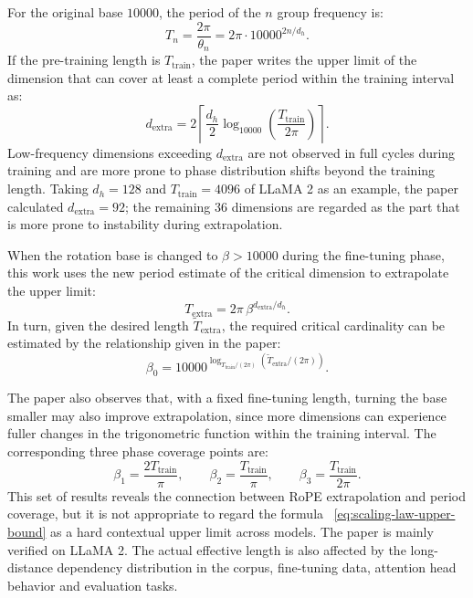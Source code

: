 \documentclass[UTF8,fontset=none,a4paper,10pt]{ctexart}
\begin{document}
For the original base $10000$, the period of the $n$ group frequency is:
\begin{equation}
  T_n=\frac{2\pi}{\theta_n}=2\pi\cdot10000^{2n/d_h}.
  \label{eq:scaling-period}
\end{equation}
If the pre-training length is $T_{\mathrm{train}}$, the paper writes the upper limit of the dimension that can cover at least a complete period within the training interval as:
\begin{equation}
  d_{\mathrm{extra}}
  =2\left\lceil
  \frac{d_h}{2}\log_{10000}\!\left(\frac{T_{\mathrm{train}}}{2\pi}\right)
  \right\rceil.
  \label{eq:critical-dimension-scaling-law}
\end{equation}
Low-frequency dimensions exceeding $d_{\mathrm{extra}}$ are not observed in full cycles during training and are more prone to phase distribution shifts beyond the training length. Taking $d_h=128$ and $T_{\mathrm{train}}=4096$ of LLaMA 2 as an example, the paper calculated $d_{\mathrm{extra}}=92$; the remaining 36 dimensions are regarded as the part \cite{liu2024scalingrope} that is more prone to instability during extrapolation.

When the rotation base is changed to $\beta>10000$ during the fine-tuning phase, this work uses the new period estimate of the critical dimension to extrapolate the upper limit:
\begin{equation}
  T_{\mathrm{extra}}
  =2\pi\,\beta^{d_{\mathrm{extra}}/d_h}.
  \label{eq:scaling-law-upper-bound}
\end{equation}
In turn, given the desired length $\widetilde T_{\mathrm{extra}}$, the required critical cardinality can be estimated by the relationship given in the paper:
\begin{equation}
  \beta_0
  =10000^{\log_{T_{\mathrm{train}}/(2\pi)}
  \left(\widetilde T_{\mathrm{extra}}/(2\pi)\right)}.
  \label{eq:scaling-law-critical-base}
\end{equation}

The paper also observes that, with a fixed fine-tuning length, turning the base smaller may also improve extrapolation, since more dimensions can experience fuller changes in the trigonometric function within the training interval. The corresponding three phase coverage points are:
\begin{equation}
  \beta_1=\frac{2T_{\mathrm{train}}}{\pi},\qquad
  \beta_2=\frac{T_{\mathrm{train}}}{\pi},\qquad
  \beta_3=\frac{T_{\mathrm{train}}}{2\pi}.
  \label{eq:scaling-law-small-base}
\end{equation}
This set of results reveals the connection between RoPE extrapolation and period coverage, but it is not appropriate to regard the formula ~\eqref{eq:scaling-law-upper-bound} as a hard contextual upper limit across models. The paper is mainly verified on LLaMA 2. The actual effective length is also affected by the long-distance dependency distribution in the corpus, fine-tuning data, attention head behavior and evaluation tasks.
\end{document}
